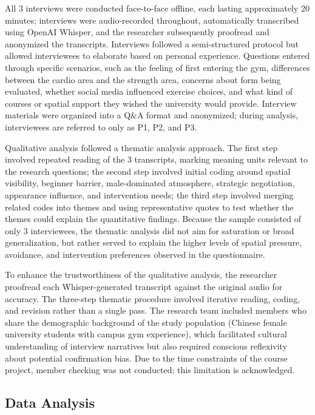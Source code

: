All 3 interviews were conducted face-to-face offline, each lasting approximately 20 minutes; interviews were audio-recorded throughout, automatically transcribed using OpenAI Whisper, and the researcher subsequently proofread and anonymized the transcripts.
Interviews followed a semi-structured protocol but allowed interviewees to elaborate based on personal experience.
Questions entered through specific scenarios, such as the feeling of first entering the gym, differences between the cardio area and the strength area, concerns about form being evaluated, whether social media influenced exercise choices, and what kind of courses or spatial support they wished the university would provide.
Interview materials were organized into a Q\&A format and anonymized; during analysis, interviewees are referred to only as P1, P2, and P3.

Qualitative analysis followed a thematic analysis approach.
The first step involved repeated reading of the 3 transcripts, marking meaning units relevant to the research questions; the second step involved initial coding around spatial visibility, beginner barrier, male-dominated atmosphere, strategic negotiation, appearance influence, and intervention needs; the third step involved merging related codes into themes and using representative quotes to test whether the themes could explain the quantitative findings.
Because the sample consisted of only 3 interviewees, the thematic analysis did not aim for saturation or broad generalization, but rather served to explain the higher levels of spatial pressure, avoidance, and intervention preferences observed in the questionnaire.

To enhance the trustworthiness of the qualitative analysis, the researcher proofread each Whisper-generated transcript against the original audio for accuracy.
The three-step thematic procedure involved iterative reading, coding, and revision rather than a single pass.
The research team included members who share the demographic background of the study population (Chinese female university students with campus gym experience), which facilitated cultural understanding of interview narratives but also required conscious reflexivity about potential confirmation bias.
Due to the time constraints of the course project, member checking was not conducted; this limitation is acknowledged.

\subsection{Data Analysis}

